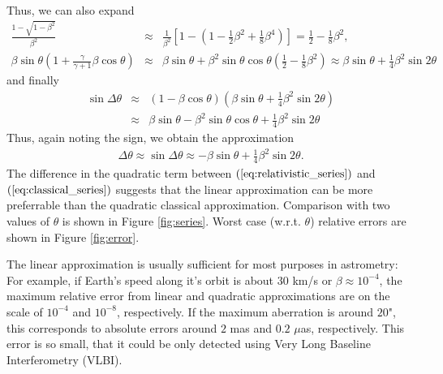 \documentclass [12pt, a4paper] {article}
\begin{document}
Thus, we can also expand 
\begin {eqnarray}
  \frac{1 - \sqrt{1 - \beta^2}}{\beta^2}
    &\approx&
    \frac{1}{\beta^2}
    \left[
        1 - \left(1 - \frac{1}{2}\beta^2 + \frac{1}{8}\beta^4\right)
    \right]
    =
    \frac{1}{2} - \frac{1}{8}\beta^2,
    \\
    \beta\sin\theta\left(
        1 + \frac{\gamma}{\gamma + 1}\beta\cos\theta
    \right)
    &\approx&
    \beta\sin\theta + \beta^2\sin\theta\cos\theta 
    \left(
         \frac{1}{2} - \frac{1}{8}\beta^2
    \right)
    \approx
    \beta\sin\theta + \frac{1}{4}\beta^2\sin 2\theta\quad
\end {eqnarray}
and finally 
\begin {eqnarray}
    \sin\Delta\theta 
    &\approx&
    \left(1 - \beta\cos\theta\right)
    \left(\beta\sin\theta + \frac{1}{4}\beta^2\sin 2\theta\right)    
    \\
    &\approx&
    \beta\sin\theta - \beta^2\sin\theta\cos\theta + \frac{1}{4}\beta^2\sin 2\theta
\end {eqnarray}
Thus, again noting the sign, we obtain the approximation
\begin{eqnarray}
    \label{eq:relativistic_series}
    \boxed{
        \quad
        \Delta\theta
        \approx
        \sin\Delta\theta
        \approx
        -\beta\sin\theta + \frac{1}{4}\beta^2\sin 2\theta.
        \quad        
    }
\end {eqnarray}
The difference in the quadratic term between $(\ref{eq:relativistic_series})$ 
and $(\ref{eq:classical_series})$ suggests that the linear approximation can be
more preferrable than the quadratic classical approximation. 
Comparison with two values of $\theta$ is shown in Figure \ref{fig:series}.
Worst case (w.r.t. $\theta$) relative errors are shown in Figure \ref{fig:error}.

The linear approximation is usually sufficient for most purposes in astrometry:
For example, if Earth's speed along it's orbit is about $30$ km/s or 
$\beta\approx 10^{-4}$, the maximum relative error from linear and quadratic 
approximations are on the scale of $10^{-4}$ and $10^{-8}$, respectively. If the 
maximum aberration is around $20$", this corresponds to absolute errors 
around $2$ mas and $0.2$ $\mu$as, respectively. This error is so small, that 
it could be only detected using Very Long Baseline Interferometry (VLBI).
\end{document}

